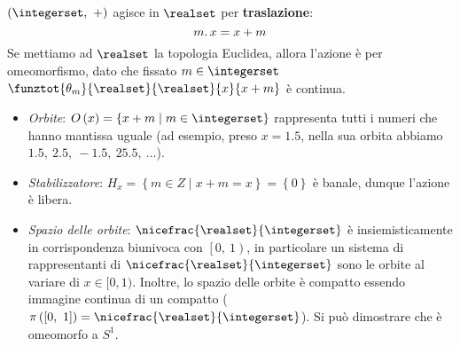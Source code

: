 \begin{example}
	$\left(\integerset,\ +\right)$ agisce in $\realset$ per \textbf{traslazione}:
	\begin{equation}
		m\ldotp x = x+m
	\end{equation}
Se mettiamo ad $\realset$ la topologia Euclidea, allora l'azione è per omeomorfismo, dato che fissato $m\in \integerset$ $\funztot{\theta_m}{\realset}{\realset}{x}{x+m}$ è continua.
\begin{itemize}
	\item \textit{Orbite}: $O\left(x\right)=\left\{x+m\mid m\in \integerset\right\}$ rappresenta tutti i numeri che hanno mantissa uguale (ad esempio, preso $x=1.5$, nella sua orbita abbiamo $1.5,\ 2.5,\ -1.5,\ 25.5,\ \ldots$).
	\item \textit{Stabilizzatore}: $H_x=\left\{m\in Z\mid x+m=x\right\}=\left\{0\right\}$ è banale, dunque l'azione è libera.
	\item \textit{Spazio delle orbite}: $\nicefrac{\realset}{\integerset}$ è insiemisticamente in corrispondenza biunivoca con $\left[0,\ 1\right)$, in particolare un sistema di rappresentanti di $\nicefrac{\realset}{\integerset}$ sono le orbite al variare di $x\in[0,1)$. Inoltre, lo spazio delle orbite è compatto essendo immagine continua di un compatto ($\pi\left(\left[0,\ 1\right]\right)=\nicefrac{\realset}{\integerset}$). Si può dimostrare che è omeomorfo a $S^1$.
\end{itemize}
\end{example}
